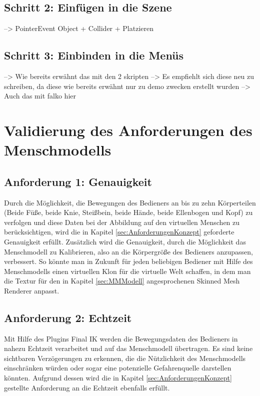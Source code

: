 \subsection{Schritt 2: Einfügen in die Szene}
--> PointerEvent Object + Collider + Platzieren

\subsection{Schritt 3: Einbinden in die Menüs}
--> Wie bereits erwähnt das mit den 2 skripten
--> Es empfiehlt sich diese neu zu schreiben, da diese wie bereits erwähnt nur zu demo zwecken erstellt wurden
--> Auch das mit falko hier

\section{Validierung des Anforderungen des Menschmodells}\label{sec:ValidMensch}

\subsection{Anforderung 1: Genauigkeit}
Durch die Möglichkeit, die Bewegungen des Bedieners an bis zu zehn Körperteilen (Beide Füße, beide Knie, Steißbein, beide Hände, beide Ellenbogen und Kopf) zu verfolgen und diese Daten bei der Abbildung auf den virtuellen Menschen zu berücksichtigen, wird die in Kapitel \ref{sec:AnforderungenKonzept} geforderte Genauigkeit erfüllt. Zusätzlich wird die Genauigkeit, durch die Möglichkeit das Menschmodell zu Kalibrieren, also an die Körpergröße des Bedieners anzupassen, verbessert. So könnte man in Zukunft für jeden beliebigen Bediener mit Hilfe des Menschmodells einen virtuellen Klon für die virtuelle Welt schaffen, in dem man die Textur für den in Kapitel \ref{sec:MMModell} angesprochenen Skinned Mesh Renderer anpasst.

\subsection{Anforderung 2: Echtzeit}
Mit Hilfe des Plugins Final IK werden die Bewegungsdaten des Bedieners in nahezu Echtzeit verarbeitet und auf das Menschmodell übertragen. Es sind keine sichtbaren Verzögerungen zu erkennen, die die Nützlichkeit des Menschmodells einschränken würden oder sogar eine potenzielle Gefahrenquelle darstellen könnten. Aufgrund dessen wird die in Kapitel \ref{sec:AnforderungenKonzept} gestellte Anforderung an die Echtzeit ebenfalls erfüllt.

